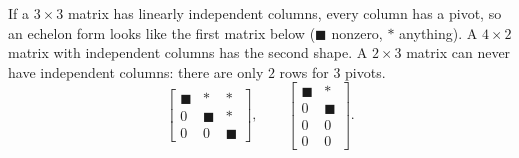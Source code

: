 \documentclass[10pt]{scrartcl}
\begin{document}
\begin{example*}
If a $3\times3$ matrix has linearly independent columns, every column has a pivot, so an echelon form looks like the first matrix below ($\blacksquare$ nonzero, $*$ anything). A $4\times2$ matrix with independent columns has the second shape. A $2\times 3$ matrix can never have independent columns: there are only $2$ rows for $3$ pivots.
\[
  \begin{bmatrix}\blacksquare&*&*\\0&\blacksquare&*\\0&0&\blacksquare\end{bmatrix},
  \qquad
  \begin{bmatrix}\blacksquare&*\\0&\blacksquare\\0&0\\0&0\end{bmatrix}.
\]
\end{example*}
\end{document}
